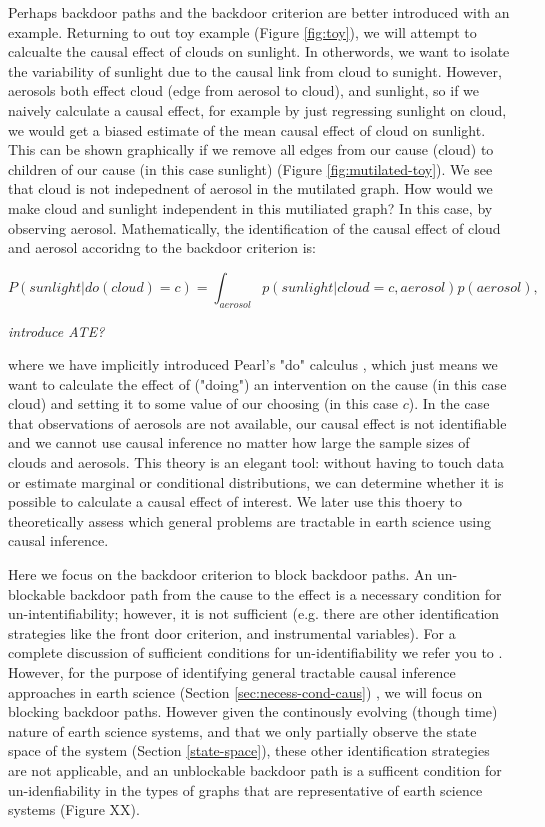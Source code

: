 \documentclass[12pt]{article}
\begin{document}
Perhaps backdoor paths and the backdoor criterion are better
introduced with an example. Returning to out toy example (Figure
\ref{fig:toy}), we will attempt to calcualte the causal effect of
clouds on sunlight. In otherwords, we want to isolate the variability
of sunlight due to the causal link from cloud to sunight. However,
aerosols both effect cloud (edge from aerosol to cloud), and sunlight,
so if we naively calculate a causal effect, for example by just
regressing sunlight on cloud, we would get a biased estimate of the
mean causal effect of cloud on sunlight. This can be shown graphically
if we remove all edges from our cause (cloud) to children of our cause
(in this case sunlight) (Figure \ref{fig:mutilated-toy}). We see that
cloud is not indepednent of aerosol in the mutilated graph. How would
we make cloud and sunlight independent in this mutiliated graph?  In
this case, by observing aerosol. Mathematically, the identification of
the causal effect of cloud and aerosol accoridng to the backdoor
criterion is:

\begin{equation}
  P(sunlight | do(cloud) = c) = \int_{aerosol} p(sunlight| cloud = c,
  aerosol) p(aerosol),
\end{equation}

\emph{introduce ATE?}

where we have implicitly introduced Pearl's "do" calculus
\citep{pearl2009}, which just means we want to calculate the effect of
("doing") an intervention on the cause (in this case cloud) and
setting it to some value of our choosing (in this case \(c\)). In the
case that observations of aerosols are not available, our causal
effect is not identifiable and we cannot use causal inference no
matter how large the sample sizes of clouds and aerosols. This theory
is an elegant tool: without having to touch data or estimate marginal
or conditional distributions, we can determine whether it is possible
to calculate a causal effect of interest. We later use this thoery to
theoretically assess which general problems are tractable in earth
science using causal inference.

Here we focus on the backdoor criterion to block backdoor paths. An
un-blockable backdoor path from the cause to the effect is a necessary
condition for un-intentifiability; however, it is not sufficient
(e.g. there are other identification strategies like the front door
criterion, and instrumental variables). For a complete discussion of
sufficient conditions for un-identifiability we refer you to
\citet{shpitser2006}. However, for the purpose of identifying
general tractable causal inference approaches in earth science
(Section \ref{sec:necess-cond-caus}) , we
will focus on blocking backdoor paths. However given the continously
evolving (though time) nature of earth science systems, and that we
only partially observe the state space of the system (Section
\ref{state-space}), these other identification strategies are not
applicable, and an unblockable backdoor path is a sufficent condition
for un-idenfiability in the types of graphs that are representative of
earth science systems (Figure XX).
\end{document}
